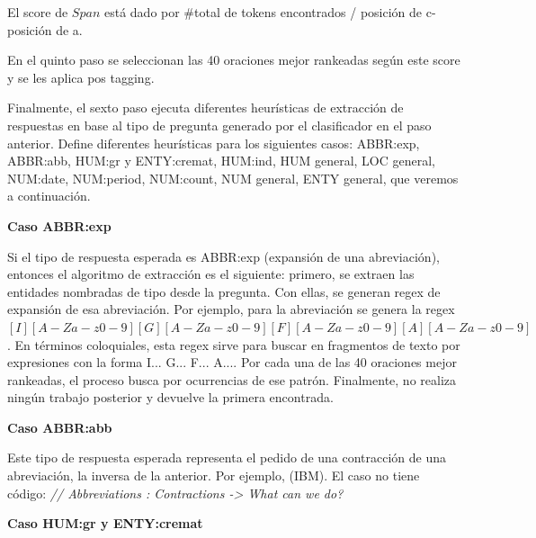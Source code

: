 El score de $Span$ está dado por \#total de tokens encontrados /  {\textbar}posición de c- posición de a{\textbar}.



\medskip

En el quinto paso se seleccionan las 40 oraciones mejor rankeadas según este score y se les aplica pos tagging.

Finalmente, el sexto paso ejecuta diferentes heurísticas de extracción de respuestas en base al tipo de pregunta generado por el clasificador en el paso anterior.
Define diferentes heurísticas para los siguientes casos: ABBR:exp, ABBR:abb, HUM:gr y ENTY:cremat, HUM:ind, HUM general, LOC general, NUM:date, NUM:period, NUM:count, NUM general, ENTY general, que veremos a continuación.\newline

\textbf{Caso ABBR:exp}\newline

Si el tipo de respuesta esperada es ABBR:exp (expansión de una abreviación), entonces el algoritmo de extracción es el siguiente: primero, se extraen las entidades nombradas de tipo  desde la pregunta. Con ellas, se generan regex de expansión de esa abreviación. Por ejemplo, para la abreviación  se genera la regex $[I][A-Za-z0-9][G][A-Za-z0-9][F][A-Za-z0-9][A][A-Za-z0-9]$. En términos coloquiales, esta regex sirve para buscar en fragmentos de texto por expresiones con la forma I... G... F... A.... Por cada una de las 40 oraciones mejor rankeadas, el proceso busca por ocurrencias de ese patrón. Finalmente, no realiza ningún trabajo posterior y devuelve la primera encontrada. \newline

\textbf{Caso ABBR:abb}\newline

Este tipo de respuesta esperada representa el pedido de una contracción de una abreviación, la inversa de la anterior. Por ejemplo,  (IBM). El caso no tiene código: \textit{// Abbreviations : Contractions -> What can we do?} \newline

\textbf{Caso HUM:gr y ENTY:cremat} \newline

